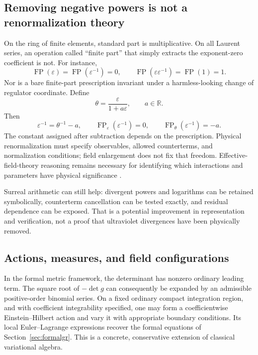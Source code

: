 \documentclass[11pt,a4paper]{article}
\numberwithin{equation}{section}
\theoremstyle{definition}
\theoremstyle{remark}
\newcommand{\R}{\mathbb R}
\newcommand{\eps}{\varepsilon}
\DeclareMathOperator{\FP}{FP}
\begin{document}
\subsection{Removing negative powers is not a renormalization theory}
On the ring of finite elements, standard part is multiplicative. On all Laurent series, an operation called ``finite part'' that simply extracts the exponent-zero coefficient is not. For instance,
\begin{equation}
 \FP(\eps)=\FP(\eps^{-1})=0,
 \qquad \FP(\eps\eps^{-1})=\FP(1)=1.
\end{equation}
Nor is a bare finite-part prescription invariant under a harmless-looking change of regulator coordinate. Define
\begin{equation}
 \theta=\frac{\eps}{1+a\eps},\qquad a\in\R.
\end{equation}
Then
\begin{equation}\label{eq:finitepart}
 \eps^{-1}=\theta^{-1}-a,
 \qquad \FP_{\eps}(\eps^{-1})=0,
 \qquad \FP_{\theta}(\eps^{-1})=-a.
\end{equation}
The constant assigned after subtraction depends on the prescription. Physical renormalization must specify observables, allowed counterterms, and normalization conditions; field enlargement does not fix that freedom. Effective-field-theory reasoning remains necessary for identifying which interactions and parameters have physical significance \cite{Donoghue}.

Surreal arithmetic can still help: divergent powers and logarithms can be retained symbolically, counterterm cancellation can be tested exactly, and residual dependence can be exposed. That is a potential improvement in representation and verification, not a proof that ultraviolet divergences have been physically removed.

\subsection{Actions, measures, and field configurations}
In the formal metric framework, the determinant has nonzero ordinary leading term. The square root of $-\det g$ can consequently be expanded by an admissible positive-order binomial series. On a fixed ordinary compact integration region, and with coefficient integrability specified, one may form a coefficientwise Einstein--Hilbert action and vary it with appropriate boundary conditions. Its local Euler--Lagrange expressions recover the formal equations of Section~\ref{sec:formalgr}. This is a concrete, conservative extension of classical variational algebra.
\end{document}
